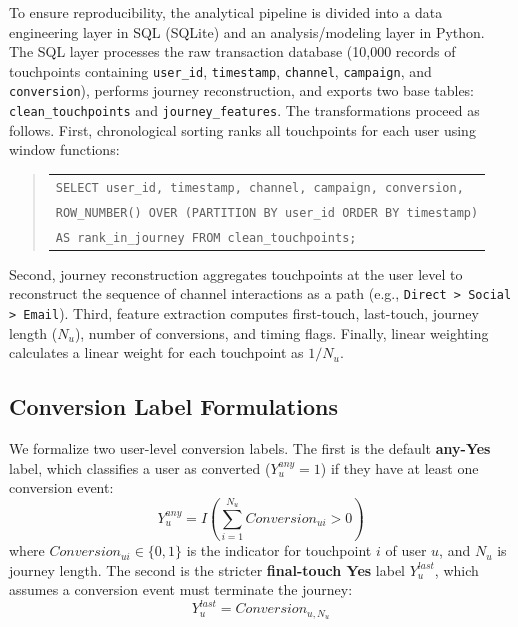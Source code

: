 \documentclass[pdflatex,sn-basic,Numbered]{sn-jnl}
\begin{document}
To ensure reproducibility, the analytical pipeline is divided into a data engineering layer in SQL (SQLite) and an analysis/modeling layer in Python. The SQL layer processes the raw transaction database (10,000 records of touchpoints containing \texttt{user\_id}, \texttt{timestamp}, \texttt{channel}, \texttt{campaign}, and \texttt{conversion}), performs journey reconstruction, and exports two base tables: \texttt{clean\_touchpoints} and \texttt{journey\_features}. The transformations proceed as follows. First, chronological sorting ranks all touchpoints for each user using window functions:
\begin{quote}
\begin{small}
\begin{tabular}{l}
\texttt{SELECT user\_id, timestamp, channel, campaign, conversion,} \\
\texttt{ROW\_NUMBER() OVER (PARTITION BY user\_id ORDER BY timestamp)} \\
\texttt{AS rank\_in\_journey FROM clean\_touchpoints;}
\end{tabular}
\end{small}
\end{quote}
Second, journey reconstruction aggregates touchpoints at the user level to reconstruct the sequence of channel interactions as a path (e.g., \texttt{Direct > Social > Email}). Third, feature extraction computes first-touch, last-touch, journey length ($N_u$), number of conversions, and timing flags. Finally, linear weighting calculates a linear weight for each touchpoint as $1/N_u$.

\subsection{Conversion Label Formulations}

We formalize two user-level conversion labels. The first is the default \textbf{any-Yes} label, which classifies a user as converted ($Y^{any}_u = 1$) if they have at least one conversion event:
\begin{equation}
Y^{any}_u = I\left(\sum_{i=1}^{N_u} Conversion_{ui} > 0\right)
\end{equation}
where $Conversion_{ui} \in \{0, 1\}$ is the indicator for touchpoint $i$ of user $u$, and $N_u$ is journey length. The second is the stricter \textbf{final-touch Yes} label $Y^{last}_u$, which assumes a conversion event must terminate the journey:
\begin{equation}
Y^{last}_u = Conversion_{u, N_u}
\end{equation}
\end{document}
